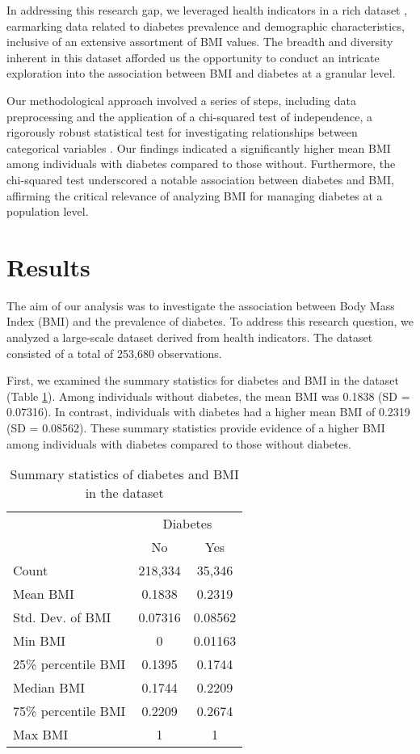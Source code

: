 \documentclass[11pt]{article}
\begin{document}
In addressing this research gap, we leveraged health indicators in a rich dataset \cite{Deberneh2021PredictionOT}, earmarking data related to diabetes prevalence and demographic characteristics, inclusive of an extensive assortment of BMI values. The breadth and diversity inherent in this dataset afforded us the opportunity to conduct an intricate exploration into the association between BMI and diabetes at a granular level.

Our methodological approach involved a series of steps, including data preprocessing and the application of a chi-squared test of independence, a rigorously robust statistical test for investigating relationships between categorical variables \cite{Mongraw-Chaffin2015TheSA}. Our findings indicated a significantly higher mean BMI among individuals with diabetes compared to those without. Furthermore, the chi-squared test underscored a notable association between diabetes and BMI, affirming the critical relevance of analyzing BMI for managing diabetes at a population level.

\section*{Results}
The aim of our analysis was to investigate the association between Body Mass Index (BMI) and the prevalence of diabetes. To address this research question, we analyzed a large-scale dataset derived from health indicators. The dataset consisted of a total of 253,680 observations.

First, we examined the summary statistics for diabetes and BMI in the dataset (Table \ref{table:summary_statistics}). Among individuals without diabetes, the mean BMI was 0.1838 (SD = 0.07316). In contrast, individuals with diabetes had a higher mean BMI of 0.2319 (SD = 0.08562). These summary statistics provide evidence of a higher BMI among individuals with diabetes compared to those without diabetes.\begin{table}[ht]
\centering
\caption{Summary statistics of diabetes and BMI in the dataset}
\label{table:summary_statistics}
\begin{tabular}{lcc}
\toprule
 & \multicolumn{2}{c}{Diabetes} \\
\cmidrule(lr){2-3}
 & No & Yes \\
\midrule
Count & 218,334 & 35,346 \\
Mean BMI & 0.1838 & 0.2319 \\
Std. Dev. of BMI & 0.07316 & 0.08562 \\
Min BMI & 0 & 0.01163\\
25\% percentile BMI & 0.1395 & 0.1744\\
Median BMI & 0.1744 & 0.2209\\
75\% percentile BMI & 0.2209 & 0.2674\\
Max BMI & 1 &  1 \\
\bottomrule
\end{tabular}
\end{table}
\end{document}
